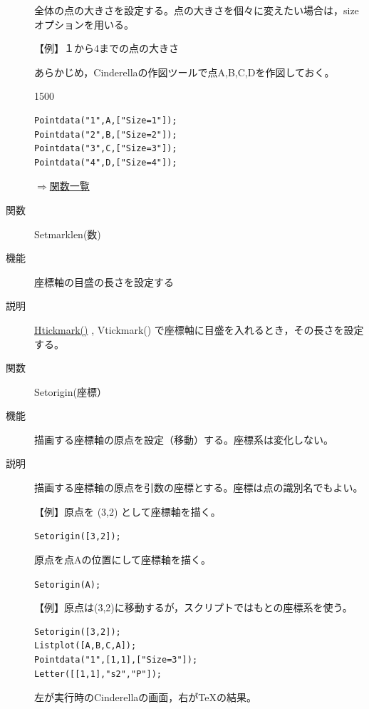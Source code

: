 \documentclass[papersize,a4paper,12pt,uplatex]{jsarticle}
\begin{document}
\begin{description}
全体の点の大きさを設定する。点の大きさを個々に変えたい場合は，sizeオプションを用いる。

\vspace{\baselineskip}
【例】１から4までの点の大きさ

あらかじめ，Cinderellaの作図ツールで点A,B,C,Dを作図しておく。

\begin{layer}{150}{0}
\end{layer}

\begin{verbatim}
Pointdata("1",A,["Size=1"]);
Pointdata("2",B,["Size=2"]);
Pointdata("3",C,["Size=3"]);
Pointdata("4",D,["Size=4"]);
\end{verbatim}


\begin{flushright}\hyperlink{functionlist}{$\Rightarrow$関数一覧}\end{flushright}


\vspace{\baselineskip}
\hypertarget{setmarklen}{}
\item[関数]Setmarklen(数)
\item[機能]座標軸の目盛の長さを設定する
\item[説明] \hyperlink{htickmark}{Htickmark()} , Vtickmark() で座標軸に目盛を入れるとき，その長さを設定する。 

\vspace{\baselineskip}
\hypertarget{setorigin}{}
\item[関数]Setorigin(座標）
\item[機能]描画する座標軸の原点を設定（移動）する。座標系は変化しない。
\item[説明]描画する座標軸の原点を引数の座標とする。座標は点の識別名でもよい。

\vspace{\baselineskip}
【例】原点を (3,2) として座標軸を描く。

\hspace{10mm}\verb|Setorigin([3,2]);|

原点を点Aの位置にして座標軸を描く。

\hspace{10mm}\verb|Setorigin(A);|

\vspace{\baselineskip}
【例】原点は(3,2)に移動するが，スクリプトではもとの座標系を使う。
\begin{verbatim}
Setorigin([3,2]);
Listplot([A,B,C,A]);
Pointdata("1",[1,1],["Size=3"]);
Letter([[1,1],"s2","P"]);
\end{verbatim}
左が実行時のCinderellaの画面，右が\TeX の結果。\\


\end{description}
\end{document}
